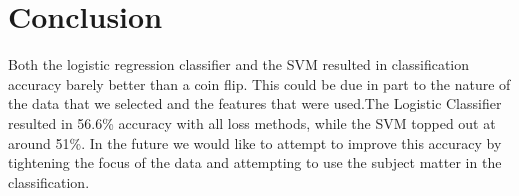 \documentclass{article}
\begin{document}
\section{Conclusion}
Both the logistic regression classifier and the SVM resulted in classification accuracy barely better than a coin flip. This could be due in part to the nature of the data that we selected and the features that were used.The Logistic Classifier resulted in 56.6\% accuracy with all loss methods, while the SVM topped out at around 51\%. In the future we would like to attempt to improve this accuracy by tightening the focus of the data and attempting to use the subject matter in the classification. 


\nocite{github}
\nocite{vowpalWabbit}
\nocite{sciKit}


\end{document}
